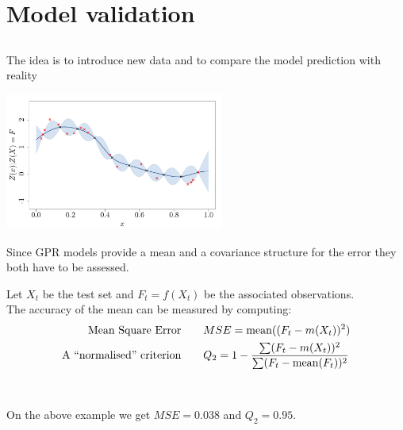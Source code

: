 \documentclass{beamer}
\begin{document}
\section{Model validation}
\subsection{}

\begin{frame}{}
The idea is to introduce new data and to compare the model prediction with reality
\begin{center}
\includegraphics[height=4.5cm]{figures/VALID_testset}
\end{center}
\vspace{3mm}
Since GPR models provide a mean and a covariance structure for the error they both have to be assessed.
\end{frame}

\begin{frame}{}
Let $X_t$ be the test set and $F_t=f(X_t)$ be the associated observations.\\ \vspace{5mm}
The accuracy of the mean can be measured by computing:
\begin{equation*}
	\begin{split}
		\text{Mean Square Error\qquad}& MSE = \mathrm{mean} ((F_t - m(X_t))^2) \\
		\text{A ``normalised'' criterion\qquad}& Q_2 = 1 - \frac{\sum (F_t - m(X_t))^2}{\sum (F_t - \mathrm{mean}(F_t))^2}
	\end{split}
\end{equation*}
\\ \ \\
On the above example we get $MSE = 0.038$ and $Q_2 = 0.95$.
\end{frame}
\end{document}

